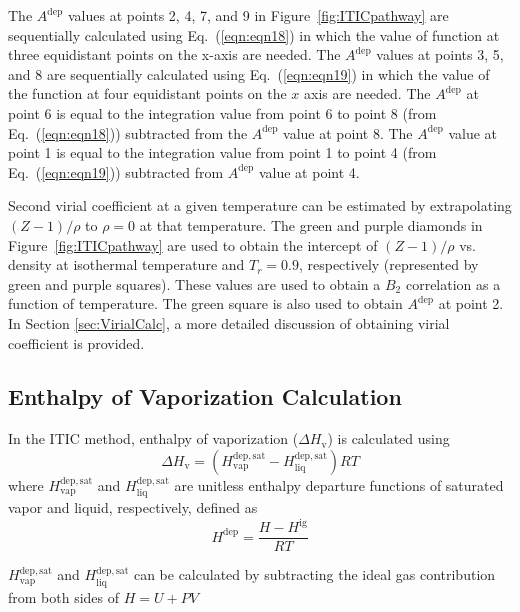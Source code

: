 \documentclass[5p,times]{elsarticle}
\begin{document}
The $A^{\mathrm{dep}}$ values at points 2, 4, 7, and 9 in Figure~\ref{fig:ITICpathway} are sequentially calculated using Eq.~(\ref{eqn:eqn18}) in which the value of function at three equidistant points on the x-axis are needed. The $A^{\mathrm{dep}}$ values at points 3, 5, and 8 are sequentially calculated using Eq.~(\ref{eqn:eqn19}) in which the value of the function at four equidistant points on the $x$ axis are needed. The $A^{\mathrm{dep}}$ at point 6 is equal to the integration value from point 6 to point 8 (from Eq.~(\ref{eqn:eqn18})) subtracted from the $A^{\mathrm{dep}}$ value at point 8. The $A^{\mathrm{dep}}$ value at point 1 is equal to the integration value from point 1 to point 4 (from Eq.~(\ref{eqn:eqn19})) subtracted from $A^{\mathrm{dep}}$ value at point 4. 

Second virial coefficient at a given temperature can be estimated by extrapolating $(Z-1)/\rho$ to $\rho=0$ at that temperature. The green and purple diamonds in Figure~\ref{fig:ITICpathway} are used to obtain the intercept of $(Z-1)/\rho$ vs. density at isothermal temperature and $T_r=0.9$, respectively (represented by green and purple squares). These values are used to obtain a $B_2$ correlation as a function of temperature. The green square is also used to obtain $A^\mathrm{dep}$ at point 2. In Section \ref{sec:VirialCalc}, a more detailed discussion of obtaining virial coefficient is provided.

\subsection{Enthalpy of Vaporization Calculation}\label{sec:HvapCalc}
In the ITIC method, enthalpy of vaporization ($\Delta H_\mathrm{v}$) is calculated using
\begin{equation}
\Delta H_\mathrm{v}= ( H^{\mathrm{dep,sat}}_\mathrm{vap} - H^{\mathrm{dep,sat}}_\mathrm{liq})RT
\label{eqn:Hvap}
\end{equation}
where $H^{\mathrm{dep,sat}}_\mathrm{vap}$ and $H^{\mathrm{dep,sat}}_\mathrm{liq}$ are unitless enthalpy departure functions of saturated vapor and liquid, respectively, defined as
\begin{equation}
H^{\mathrm{dep}}=\frac{H-H^{\mathrm{ig}}}{RT}
\label{hdep}
\end{equation}

$H^{\mathrm{dep,sat}}_\mathrm{vap}$ and $H^{\mathrm{dep,sat}}_\mathrm{liq}$  can be calculated by subtracting the ideal gas contribution from both sides of $H=U+PV$
\end{document}

